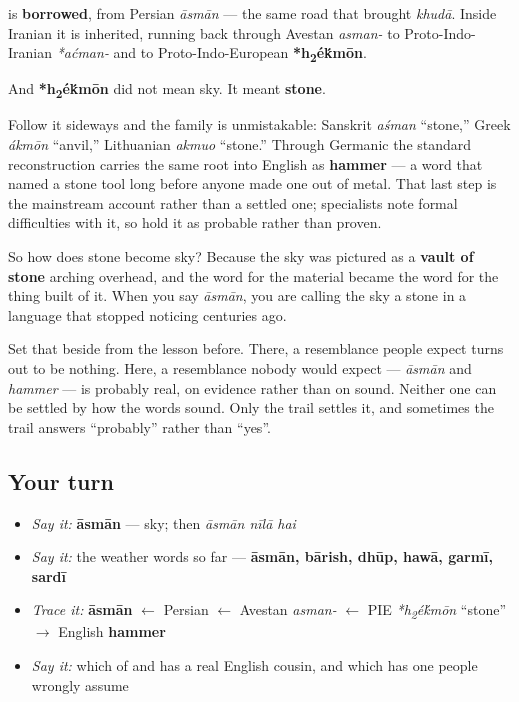 \begin{cousinweb}
\textbf{} is \textbf{borrowed}, from Persian \emph{āsmān} — the same road that brought \emph{khudā}. Inside Iranian it is inherited, running back through Avestan \emph{asman-} to Proto-Indo-Iranian \emph{*aćman-} and to Proto-Indo-European \textbf{*h\textsubscript{2}é\'{k}mōn}.

And \textbf{*h\textsubscript{2}é\'{k}mōn} did not mean sky. It meant \textbf{stone}.

Follow it sideways and the family is unmistakable: Sanskrit \emph{aśman} \textquotedblleft{}stone,\textquotedblright{} Greek \emph{ákmōn} \textquotedblleft{}anvil,\textquotedblright{} Lithuanian \emph{akmuo} \textquotedblleft{}stone.\textquotedblright{} Through Germanic the standard reconstruction carries the same root into English as \textbf{hammer} — a word that named a stone tool long before anyone made one out of metal. That last step is the mainstream account rather than a settled one; specialists note formal difficulties with it, so hold it as probable rather than proven.

So how does stone become sky? Because the sky was pictured as a \textbf{vault of stone} arching overhead, and the word for the material became the word for the thing built of it. When you say \emph{āsmān}, you are calling the sky a stone in a language that stopped noticing centuries ago.

Set that beside \textbf{} from the lesson before. There, a resemblance people expect turns out to be nothing. Here, a resemblance nobody would expect — \emph{āsmān} and \emph{hammer} — is probably real, on evidence rather than on sound. Neither one can be settled by how the words sound. Only the trail settles it, and sometimes the trail answers \textquotedblleft{}probably\textquotedblright{} rather than \textquotedblleft{}yes\textquotedblright{}.
\end{cousinweb}

\subsection*{Your turn}
\begin{itemize}
\raggedright
  \item \emph{Say it:} \textbf{āsmān} — sky; then \emph{āsmān nīlā hai}
  \item \emph{Say it:} the weather words so far — \textbf{āsmān, bārish, dhūp, hawā, garmī, sardī}
  \item \emph{Trace it:} \textbf{āsmān} $\leftarrow$ Persian $\leftarrow$ Avestan \emph{asman-} $\leftarrow$ PIE \emph{*h\textsubscript{2}é\'{k}mōn} \textquotedblleft{}stone\textquotedblright{} $\to$ English \textbf{hammer}
  \item \emph{Say it:} which of \textbf{} and \textbf{} has a real English cousin, and which has one people wrongly assume
\end{itemize}


